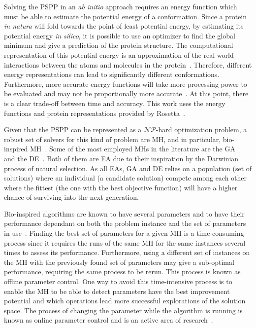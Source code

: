 Solving the \ac{PSPP} in an \textit{ab initio} approach requires an energy function
which must be able to estimate the potential energy of a conformation. Since a
protein \textit{in natura} will fold towards the point of least potential
energy, by estimating its potential energy \textit{in silico}, it is possible to
use an optimizer to find the global minimum and give a prediction of the
protein structure. The computational representation of this potential energy is
an approximation of the real world interactions between the atoms and molecules
in the protein~\cite{alford2017rosetta}. Therefore,
different energy representations can lead to
significantly different conformations. Furthermore, more accurate energy
functions will take more processing power to be evaluated and may not be
proportionally more accurate~\cite{xu2012ab}. At this point,
there is a clear trade-off between time and accuracy.
This work uses the energy functions and protein representations provided by
Rosetta~\cite{rohl2004protein,leaver2011rosetta3}.

Given that the \ac{PSPP} can be represented as a $\mathcal{NP}$-hard optimization
problem, a robust set of solvers for this kind of problem are
\ac{MH}, and in particular, bio-inspired \ac{MH}~\cite{kar2016bio}.
Some of the most employed \ac{MH}s in the literature are the
\ac{GA}~\cite{holland1992genetic} and the
\ac{DE}~\cite{storn1997differential}. Both of them are
\ac{EA} due to their inspiration by the Darwinian process of natural
selection. As all \ac{EA}s, \ac{GA} and \ac{DE} relies on a population
(set of solutions) where an
individual (a candidate solution) compete among each other where the fittest (the one
with the best objective function) will have a higher chance of surviving into
the next generation.

Bio-inspired algorithms are known to have several parameters and to have their
performance dependant on both the problem instance and the set of parameters in
use~\cite{eiben2007parameter}.
Finding the best set of parameters for a given \ac{MH} is a time-consuming
process since it requires the runs of the same \ac{MH} for the same instances
several times to assess its performance. Furthermore, using a different set of
instances on the \ac{MH} with the previously found set of parameters may give a
sub-optimal performance, requiring the same process to be rerun.  This process
is known as offline parameter control. One way to avoid this time-intensive
process is to enable the \ac{MH} to be able to detect parameters have the best
improvement potential and which operations lead more successful explorations of
the solution space. The process of changing the parameter while the algorithm
is running is known as online parameter control and is an active area of
research~\cite{parpinelli18review}.

